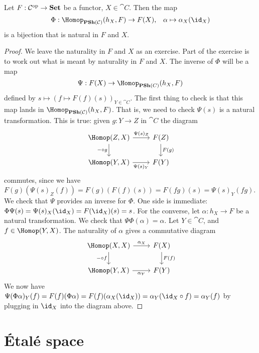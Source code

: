\begin{lem}[name={Yoneda Lemma~\cite[Theorem~2.2.4]{riehlCategoryTheoryContext2016}}]\label{lem:yoneda}
    Let $F: \mathcal{C}^{\mathrm{op}} \to \mathbf{Set}$ be a functor, $X \in \cat C$. Then the map \[
    \Phi: \Hom_{\catPresheaf(\cat C)}(h_X, F) \to F(X)\text{,} \quad \alpha\mapsto \alpha_X(\id_X)
    \] is a bijection that is natural in $F$ and $X$. 
\end{lem}
\begin{proof}
    We leave the naturality in $F$ and $X$ as an exercise. Part of the exercise is to work out what is meant by naturality in $F$ and $X$. 
    The inverse of $\Phi$ will be a map \[
    \Psi: F(X) \to \Hom_{\catPresheaf(C)}(h_X, F)
    \] defined by $s \mapsto (f \mapsto F(f)(s))_{Y \in \cat C}$.
    The first thing to check is that this map lands in $\Hom_{\catPresheaf(\cat C)}(h_X, F)$. That is, we need to check $\Psi(s)$ is a natural transformation. This is true: given $g: Y \to Z$ in $\cat C$ the diagram 
    \[
    \begin{tikzcd}
{\Hom(Z,X)} \arrow[d, "-\circ g"'] \arrow[r, "\Psi(s)_Z"] & F(Z) \arrow[d, "F(g)"] \\
{\Hom(Y,X)} \arrow[r, "\Psi(s)_Y"']                       & F(Y)            
\end{tikzcd}
    \] commutes, since we have $F(g)(\Psi(s)_Z(f)) = F(g)(F(f)(s)) = F(fg)(s) = \Psi(s)_Y(fg)$.
    We check that $\Psi$ provides an inverse for $\Phi$. One side is immediate: $\Phi \Psi(s) = \Psi(s)_X(\id_X) = F(\id_X)(s) = s$. 
    For the converse, let $\alpha: h_X \to F$ be a natural transformation. We check that $\Psi \Phi(\alpha) = \alpha$. 
    Let $Y \in \cat C$, and $f \in \Hom(Y, X)$. The naturality of $\alpha$ gives a commutative diagram
    \[
    \begin{tikzcd}
{\Hom(X,X)} \arrow[d, "-\circ f"'] \arrow[r, "\alpha_X"] & F(X) \arrow[d, "F(f)"] \\
{\Hom(Y,X)} \arrow[r, "\alpha_Y"']                        & F(Y)                  
\end{tikzcd}
\] We now have $\Psi(\Phi \alpha)_Y(f) = F(f)(\Phi \alpha) = F(f) (\alpha_X(\id_X)) = \alpha_Y (\id_X \circ f)= \alpha_Y(f)$ by plugging in $\id_X$ into the diagram above. 
\end{proof}

\section{Étalé space}

